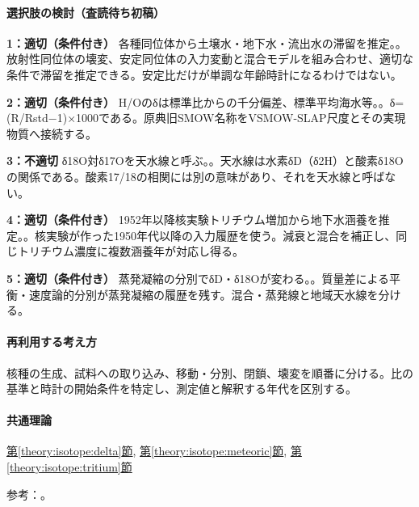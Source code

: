 \paragraph{選択肢の検討（査読待ち初稿）}\mbox{}\par

\noindent\textbf{1：適切（条件付き）} 各種同位体から土壌水・地下水・流出水の滞留を推定。。放射性同位体の壊変、安定同位体の入力変動と混合モデルを組み合わせ、適切な条件で滞留を推定できる。安定比だけが単調な年齢時計になるわけではない。\par

\noindent\textbf{2：適切（条件付き）} H/Oのδは標準比からの千分偏差、標準平均海水等。。δ=(R/Rstd−1)×1000である。原典旧SMOW名称をVSMOW-SLAP尺度とその実現物質へ接続する。\par

\noindent\textbf{3：不適切} δ18O対δ17Oを天水線と呼ぶ。。天水線は水素δD（δ2H）と酸素δ18Oの関係である。酸素17/18の相関には別の意味があり、それを天水線と呼ばない。\par

\noindent\textbf{4：適切（条件付き）} 1952年以降核実験トリチウム増加から地下水涵養を推定。。核実験が作った1950年代以降の入力履歴を使う。減衰と混合を補正し、同じトリチウム濃度に複数涵養年が対応し得る。\par

\noindent\textbf{5：適切（条件付き）} 蒸発凝縮の分別でδD・δ18Oが変わる。。質量差による平衡・速度論的分別が蒸発凝縮の履歴を残す。混合・蒸発線と地域天水線を分ける。\par

\paragraph{再利用する考え方} 核種の生成、試料への取り込み、移動・分別、閉鎖、壊変を順番に分ける。比の基準と時計の開始条件を特定し、測定値と解釈する年代を区別する。

\paragraph{共通理論} \hyperref[theory:isotope:delta]{第\ref*{theory:isotope:delta}節}, \hyperref[theory:isotope:meteoric]{第\ref*{theory:isotope:meteoric}節}, \hyperref[theory:isotope:tritium]{第\ref*{theory:isotope:tritium}節}

\par 参考：\cite{gc_meteoric,iso_tritium_clock,iso_vsmow2}。

